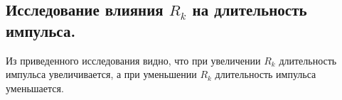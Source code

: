 \documentclass[a4paper,oneside,12pt]{extreport}
\begin{document}
\subsection{Исследование влияния $R_k$ на длительность импульса.}

Из приведенного исследования видно, что при увеличении $R_k$
длительность импульса увеличивается, а при уменьшении $R_k$
длительность импульса уменьшается.

\begin{figure}[ht!]
\end{figure}

\begin{figure}[ht!]
\end{figure}

\begin{figure}[ht!]
\end{figure}
\end{document}

